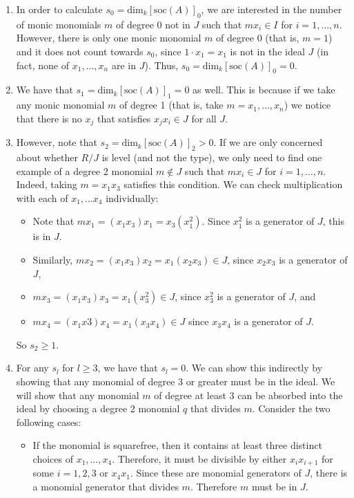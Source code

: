 \begin{enumerate}
	\item In order to calculate $s_0 = \textrm{dim}_k [\textrm{soc} (A) ]_0$, we are interested in the number of monic monomials $m$ of degree 0 not in $J$ such that $mx_i \in I$ for $i = 1, \dots, n$. However, there is only one monic monomial $m$ of degree 0 (that is, $m = 1$) and it does not count towards $s_0$, since $1 \cdot x_1 = x_1$ is not in the ideal $J$ (in fact, none of $x_1, \dots, x_n$ are in $J$). Thus, $s_0 = \textrm{dim}_k [\textrm{soc} (A) ]_0 = 0.$
	\item We have that $s_1 = \textrm{dim}_k[\textrm{soc} (A)]_1 = 0$ as well. This is because if we take any monic monomial $m$ of degree 1 (that is, take $m = x_1, \dots, x_n$) we notice that there is no $x_j$ that satisfies $x_jx_i \in J$ for all $J$.
    \item However, note that $s_2 = \textrm{dim}_k[\textrm{soc} (A) ] _ 2 > 0$. If we are only concerned about whether $R/J$ is level (and not the type), we only need to find one example of a degree 2 monomial $m \not \in J$ such that $mx_i \in J$ for $i = 1, \dots, n$. Indeed, taking $m = x_1x_3$ satisfies this condition. We can check multiplication with each of $x_1, \dots x_4$ individually:
    \begin{itemize}
    	\item Note that $mx_1 = (x_1x_3) x_1 = x_3 (x_1^2)$. Since $x_1^2$ is a generator of $J$, this is in $J$.
        \item Similarly, $mx_2 = (x_1 x_3) x_2 = x_1 (x_2 x_3) \in J$, since $x_2 x_3$ is a generator of $J$,
        \item $mx_3 = (x_1 x_3) x_3 = x_1 (x_3 ^2 )\in J$, since $x_3 ^2 $ is a generator of $J$, and
        \item $mx_4 = (x_1 x3) x_4 = x_1 (x_3 x_4) \in J$ since $x_3 x_4$ is a generator of $J$.
    \end{itemize}
    So $s_2 \geq 1$. 
	\item For any $s_l$ for $l \geq 3$, we have that $s_l = 0$. We can show this indirectly by showing that any monomial of degree 3 or greater must be in the ideal. We will show that any monomial $m$ of degree at least 3 can be absorbed into the ideal by choosing a degree 2 monomial $q$ that divides $m$. Consider the two following cases:
    \begin{itemize}
    	\item If the monomial is squarefree, then it contains at least three distinct choices of $x_1, \dots, x_4$. Therefore, it must be divisible by either $x_i x_{i+1}$ for some $i = 1, 2, 3$ or $x_4 x_1$. Since these are monomial generators of $J$, there is a monomial generator that divides $m$. Therefore $m$ must be in $J$.

\end{itemize}
\end{enumerate}

